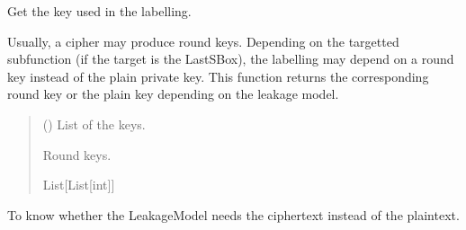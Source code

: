\documentclass[letterpaper,10pt,english]{sphinxmanual}
\begin{document}
\begin{fulllineitems}
\begin{fulllineitems}
\end{fulllineitems}


\begin{fulllineitems}
\label{\detokenize{MLSCAlib.Ciphers:MLSCAlib.Ciphers.AES_leakage.AESLeakageModel.get_used_keys}}
\pysigstartsignatures
{}
\pysigstopsignatures
\sphinxAtStartPar
Get the key used in the labelling.

\sphinxAtStartPar
Usually, a cipher may produce round keys. Depending on the targetted
sub\sphinxhyphen{}function (if the target is the LastSBox), the labelling may depend
on a round key instead of the  plain private key. This function returns
the corresponding round key or the plain key depending on the leakage model.
\begin{quote}\begin{description}
\sphinxAtStartPar
{} (\sphinxstyleliteralemphasis{\sphinxupquote{{[}}}\sphinxstyleliteralemphasis{\sphinxupquote{{[}}}\sphinxstyleliteralemphasis{\sphinxupquote{{]}}}\sphinxstyleliteralemphasis{\sphinxupquote{{]}}}) \textendash{} List of the keys.

\sphinxAtStartPar
{} \textendash{} Round keys.

\sphinxAtStartPar
List{[}List{[}int{]}{]}

\end{description}\end{quote}

\end{fulllineitems}


\begin{fulllineitems}
\label{\detokenize{MLSCAlib.Ciphers:MLSCAlib.Ciphers.AES_leakage.AESLeakageModel.needs_cipher_and_not_ptx}}
\pysigstartsignatures
{}
\pysigstopsignatures
\sphinxAtStartPar
To know whether the LeakageModel needs the ciphertext instead of the plaintext.


\end{fulllineitems}
\end{fulllineitems}
\end{document}
